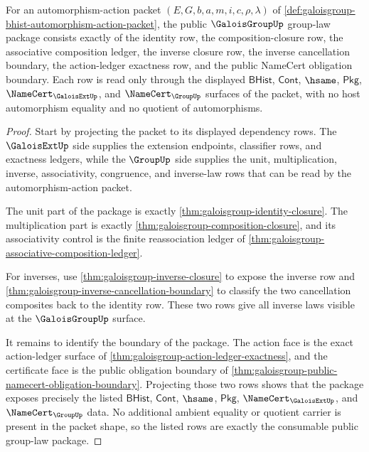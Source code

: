 \begin{theorem}
\label{thm:galoisgroup-public-group-law-package}
For an automorphism-action packet $(E,G,b,a,m,i,c,\rho,\lambda)$ of
\autoref{def:galoisgroup-bhist-automorphism-action-packet}, the public
$\GaloisGroupUp$ group-law package consists exactly of the identity row, the
composition-closure row, the associative composition ledger, the inverse
closure row, the inverse cancellation boundary, the action-ledger exactness
row, and the public NameCert obligation boundary. Each row is read only
through the displayed $\mathsf{BHist}$, $\mathsf{Cont}$, $\hsame$,
$\mathsf{Pkg}$, $\NameCert_{\GaloisExtUp}$, and $\NameCert_{\GroupUp}$
surfaces of the packet, with no host automorphism equality and no quotient of
automorphisms.
\end{theorem}
\begin{proof}
Start by projecting the packet to its displayed dependency rows. The
$\GaloisExtUp$ side supplies the extension endpoints, classifier rows, and
exactness ledgers, while the $\GroupUp$ side supplies the unit, multiplication,
inverse, associativity, congruence, and inverse-law rows that can be read by
the automorphism-action packet.

The unit part of the package is exactly
\autoref{thm:galoisgroup-identity-closure}. The multiplication part is exactly
\autoref{thm:galoisgroup-composition-closure}, and its associativity control is
the finite reassociation ledger of
\autoref{thm:galoisgroup-associative-composition-ledger}.

For inverses, use \autoref{thm:galoisgroup-inverse-closure} to expose the
inverse row and \autoref{thm:galoisgroup-inverse-cancellation-boundary} to
classify the two cancellation composites back to the identity row. These two
rows give all inverse laws visible at the $\GaloisGroupUp$ surface.

It remains to identify the boundary of the package. The action face is the
exact action-ledger surface of
\autoref{thm:galoisgroup-action-ledger-exactness}, and the certificate face is
the public obligation boundary of
\autoref{thm:galoisgroup-public-namecert-obligation-boundary}. Projecting
those two rows shows that the package exposes precisely the listed
$\mathsf{BHist}$, $\mathsf{Cont}$, $\hsame$, $\mathsf{Pkg}$,
$\NameCert_{\GaloisExtUp}$, and $\NameCert_{\GroupUp}$ data. No additional
ambient equality or quotient carrier is present in the packet shape, so the
listed rows are exactly the consumable public group-law package.
\end{proof}

